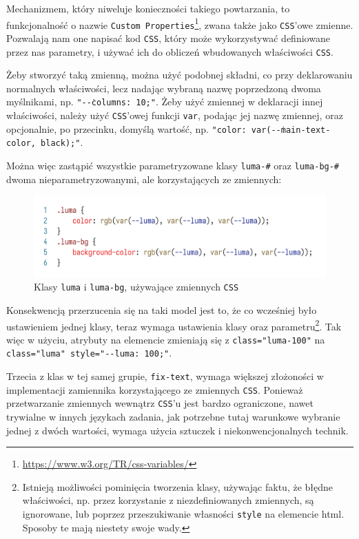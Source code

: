 \documentclass[licencjacka]{pracadypl}
\begin{document}
Mechanizmem, który niweluje konieczności takiego powtarzania, to funkcjonalność o nazwie \texttt{Custom Properties}\footnote{\url{https://www.w3.org/TR/css-variables/}}, zwana także jako \texttt{CSS}'owe zmienne. Pozwalają nam one napisać kod \texttt{CSS}, który może wykorzystywać definiowane przez nas parametry, i używać ich do obliczeń wbudowanych właściwości \texttt{CSS}.

Żeby stworzyć taką zmienną, można użyć podobnej składni, co przy deklarowaniu normalnych właściwości, lecz nadając wybraną nazwę poprzedzoną dwoma myślnikami, np. \texttt{"-\.-columns: 10;"}. Żeby użyć zmiennej w deklaracji innej właściwości, należy użyć \texttt{CSS}'owej funkcji \texttt{var}, podając jej nazwę zmiennej, oraz opcjonalnie, po przecinku, domyślą wartość, np. \texttt{"color: var(-\.-main-text-color, black);"}.

Można więc zastąpić wszystkie parametryzowane klasy \texttt{luma-\#} oraz \texttt{luma-bg-\#} dwoma nieparametryzowanymi, ale korzystających ze zmiennych:

\begin{figure}[H]
  \centering
  \includegraphics[width=\linewidth]{images/code-css-luma-vars.png}
  \caption{Klasy \texttt{luma} i \texttt{luma-bg}, używające zmiennych \texttt{CSS}}
  \label{fig:css-css-luma-vars}
\end{figure}

Konsekwencją przerzucenia się na taki model jest to, że co wcześniej było ustawieniem jednej klasy, teraz wymaga ustawienia klasy oraz parametru\footnote{Istnieją możliwości pominięcia tworzenia klasy, używając faktu, że błędne właściwości, np. przez korzystanie z niezdefiniowanych zmiennych, są ignorowane, lub poprzez przeszukiwanie własności \texttt{style} na elemencie html. Sposoby te mają niestety swoje wady.}. Tak więc w użyciu, atrybuty na elemencie zmieniają się z \texttt{class="luma-100"} na \texttt{class="luma" style="-\.-luma: 100;"}.

Trzecia z klas w tej samej grupie, \texttt{fix-text}, wymaga większej złożoności w implementacji zamiennika korzystającego ze zmiennych \texttt{CSS}. Ponieważ przetwarzanie zmiennych wewnątrz \texttt{CSS}'u jest bardzo ograniczone, nawet trywialne w innych językach zadania, jak potrzebne tutaj warunkowe wybranie jednej z dwóch wartości, wymaga użycia sztuczek i niekonwencjonalnych technik.
\end{document}
